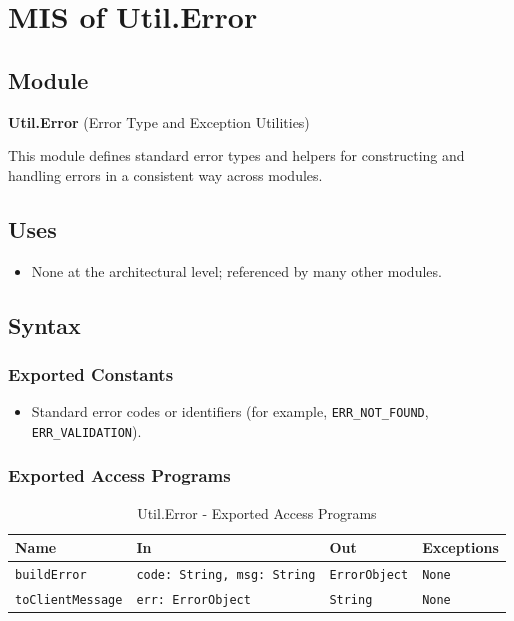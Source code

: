 \documentclass[12pt, titlepage]{article}
\begin{document}

\section{MIS of Util.Error} \label{Util.Error}

\subsection{Module}
\textbf{Util.Error} \; (Error Type and Exception Utilities)

This module defines standard error types and helpers for constructing and handling errors in a consistent way across modules.

\subsection{Uses}
\begin{itemize}
    \item None at the architectural level; referenced by many other modules.
\end{itemize}

\subsection{Syntax}

\subsubsection{Exported Constants}
\begin{itemize}
    \item Standard error codes or identifiers (for example, \texttt{ERR\_NOT\_FOUND}, \texttt{ERR\_VALIDATION}).
\end{itemize}

\subsubsection{Exported Access Programs}

\begin{table}[H]
\centering
\small
\caption{Util.Error - Exported Access Programs}
\begin{tabular}{p{3.5cm} p{4cm} p{3cm} p{3.5cm}}
\toprule
\textbf{Name} & \textbf{In} & \textbf{Out} & \textbf{Exceptions} \\
\midrule
\texttt{buildError} & \texttt{code: String, msg: String} & \texttt{ErrorObject} & \texttt{None} \\
\texttt{toClientMessage} & \texttt{err: ErrorObject} & \texttt{String} & \texttt{None} \\
\bottomrule
\end{tabular}
\end{table}
\end{document}

